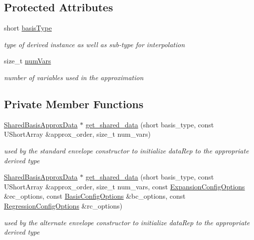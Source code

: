 \subsection*{Protected Attributes}
\begin{DoxyCompactItemize}
\item 
short \hyperlink{classPecos_1_1SharedBasisApproxData_af11c7ab2afc3a4bce7edbddb91ee7ae4}{basis\+Type}\label{classPecos_1_1SharedBasisApproxData_af11c7ab2afc3a4bce7edbddb91ee7ae4}

\begin{DoxyCompactList}\small\item\em type of derived instance as well as sub-\/type for interpolation \end{DoxyCompactList}\item 
size\+\_\+t \hyperlink{classPecos_1_1SharedBasisApproxData_ab9ee2ca7227d7347a1ddba107ffb039c}{num\+Vars}\label{classPecos_1_1SharedBasisApproxData_ab9ee2ca7227d7347a1ddba107ffb039c}

\begin{DoxyCompactList}\small\item\em number of variables used in the approximation \end{DoxyCompactList}\end{DoxyCompactItemize}
\subsection*{Private Member Functions}
\begin{DoxyCompactItemize}
\item 
\hyperlink{classPecos_1_1SharedBasisApproxData}{Shared\+Basis\+Approx\+Data} $\ast$ \hyperlink{classPecos_1_1SharedBasisApproxData_abd1905e4b592f326e5d4b6053b8e8ab2}{get\+\_\+shared\+\_\+data} (short basis\+\_\+type, const U\+Short\+Array \&approx\+\_\+order, size\+\_\+t num\+\_\+vars)
\begin{DoxyCompactList}\small\item\em used by the standard envelope constructor to initialize data\+Rep to the appropriate derived type \end{DoxyCompactList}\item 
\hyperlink{classPecos_1_1SharedBasisApproxData}{Shared\+Basis\+Approx\+Data} $\ast$ \hyperlink{classPecos_1_1SharedBasisApproxData_a328149090d0b6fc7425687c2932ed639}{get\+\_\+shared\+\_\+data} (short basis\+\_\+type, const U\+Short\+Array \&approx\+\_\+order, size\+\_\+t num\+\_\+vars, const \hyperlink{classPecos_1_1ExpansionConfigOptions}{Expansion\+Config\+Options} \&ec\+\_\+options, const \hyperlink{classPecos_1_1BasisConfigOptions}{Basis\+Config\+Options} \&bc\+\_\+options, const \hyperlink{classPecos_1_1RegressionConfigOptions}{Regression\+Config\+Options} \&rc\+\_\+options)
\begin{DoxyCompactList}\small\item\em used by the alternate envelope constructor to initialize data\+Rep to the appropriate derived type \end{DoxyCompactList}\end{DoxyCompactItemize}

